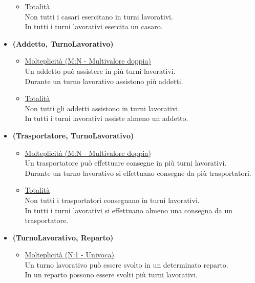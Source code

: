 \documentclass[12pt]{report}
\begin{document}
\begin{itemize}
\begin{itemize}
		\item \underline{Totalità} \\ [2mm]
			Non tutti i casari esercitano in turni lavorativi.\\
            In tutti i turni lavorativi esercita un casaro.\\
	\end{itemize}

\item \textbf{(Addetto, TurnoLavorativo) }
	\begin{itemize}
		\item \underline{Molteplicità (M:N - Multivalore doppia) } \\ [2mm]
			Un addetto può assistere in più turni lavorativi.\\
            Durante un turno lavorativo assistono più addetti.\\

		\item \underline{Totalità} \\ [2mm]
			Non tutti gli addetti assistono in turni lavorativi.\\
            In tutti i turni lavorativi assiste almeno un addetto.\\
	\end{itemize}
	
\item \textbf{(Trasportatore, TurnoLavorativo) }
	\begin{itemize}
		\item \underline{Molteplicità (M:N - Multivalore doppia) } \\ [2mm]
			Un trasportatore può effettuare consegne in più turni lavorativi.\\
            Durante un turno lavorativo si effettuano consegne da più trasportatori.\\

		\item \underline{Totalità} \\ [2mm]
			Non tutti i trasportatori consegnano in turni lavorativi.\\
            In tutti i turni lavorativi si effettuano almeno una consegna da un trasportatore.\\
	\end{itemize}

\item \textbf{(TurnoLavorativo, Reparto) }
	\begin{itemize}
		\item \underline{Molteplicità (N:1 - Univoca) } \\ [2mm]
			Un turno lavorativo può essere svolto in un determinato reparto.\\
            In un reparto possono essere svolti più turni lavorativi.\\


\end{itemize}
\end{itemize}
\end{document}
